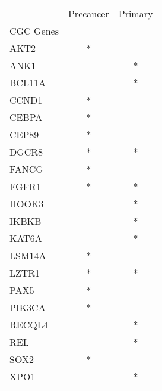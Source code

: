 \begin{tabular}{lcc}
\toprule
{} & Precancer & Primary \\
CGC Genes &           &         \\
\midrule
AKT2      &         * &         \\
ANK1      &           &       * \\
BCL11A    &           &       * \\
CCND1     &         * &         \\
CEBPA     &         * &         \\
CEP89     &         * &         \\
DGCR8     &         * &       * \\
FANCG     &         * &         \\
FGFR1     &         * &       * \\
HOOK3     &           &       * \\
IKBKB     &           &       * \\
KAT6A     &           &       * \\
LSM14A    &         * &         \\
LZTR1     &         * &       * \\
PAX5      &         * &         \\
PIK3CA    &         * &         \\
RECQL4    &           &       * \\
REL       &           &       * \\
SOX2      &         * &         \\
XPO1      &           &       * \\
\bottomrule
\end{tabular}
